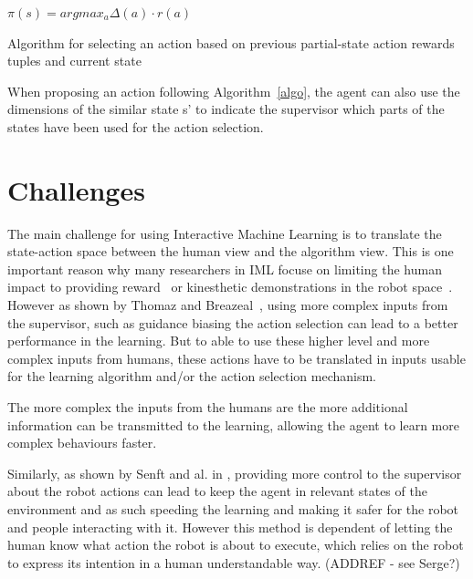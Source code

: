 \documentclass[letterpaper]{article} %
\begin{document}
\begin{algorithm}
    \DontPrintSemicolon
    $\pi(s) = argmax_{a}\Delta(a) \cdot r(a)$

    \caption{Algorithm for selecting an action based on previous
    partial-state action rewards tuples and current state}
    \label{algo}
\end{algorithm}

When proposing an action following Algorithm~\ref{algo}, the agent can also use
the dimensions of the similar state s' to indicate the supervisor which parts of
the states have been used for the action selection.

\section{Challenges}

The main challenge for using Interactive Machine Learning is to translate the
state-action space between the human view and the algorithm view. This is one
important reason why many researchers in IML focuse on limiting the human impact
to providing reward~\cite{knox2009interactively} or kinesthetic demonstrations
in the robot space~\cite{billard2008robot}. However as shown by Thomaz and Breazeal~\cite{thomaz2008teachable}, using more complex inputs from the supervisor, such
as guidance biasing the action selection can lead to a better performance in the
learning. But to able to use these higher level and more complex inputs from
humans, these actions have to be translated in inputs usable for the learning
algorithm and/or the action selection mechanism. 

The more complex the inputs from the humans are the more additional information
can be transmitted to the learning, allowing the agent to learn more complex
behaviours faster.

Similarly, as shown by Senft and al. in \cite{senft2017supervised}, providing
more control to the supervisor about the robot actions can lead to keep the
agent in relevant states of the environment and as such speeding the learning
and making it safer for the robot and people interacting with it. However this
method is dependent of letting the human know what action the robot is about to
execute, which relies on the robot to express its intention in a human
understandable way. (ADDREF - see Serge?)
\end{document}
